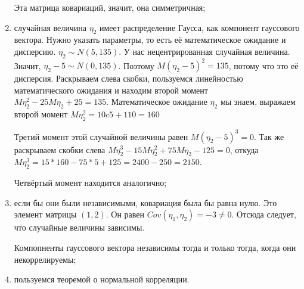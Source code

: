 \begin{enumerate}[label=\alph*)]
  Эта матрица ковариаций, значит, она симметричная;
  \item случайная величина $ \eta_2$ имеет распределение Гаусса, как компонент гауссового вектора.
  Нужно указать параметры, то есть её математическое ожидание и дисперсию.
  $ \eta_2 \sim N \left( 5, 135 \right) $.
  У нас нецентрированная случайная величина.
  Значит, $ \eta_2 - 5 \sim N \left( 0, 135 \right) $.
  Поэтому $M \left( \eta_2 - 5 \right)^2 = 135$, потому что это её дисперсия.
  Раскрываем слева скобки,
  пользуемся линейностью математического ожидания и находим второй момент
  $M \eta_2^2 - 25M \eta_2 + 25 =
    135$.
  Математическое ожидание $ \eta_2$ мы знаем,
  выражаем второй момент $M \eta_2^2 = 10 c\dot 5 + 110 = 160$

  Третий момент этой случайной величины равен $M \left( \eta_2 - 5 \right)^3 = 0$.
  Так же раскрываем скобки слева $M \eta_2^3 - 15M \eta_2^2 + 75M \eta_2 - 125 = 0$,
  откуда $M \eta_2^3 = 15 * 160 - 75 * 5 + 125 = 2400 - 250 = 2150$.

  Четвёртый момент находится аналогично;
  \item если бы они были независимыми, ковариация была бы равна нулю.
  Это элемент матрицы $ \left( 1, 2 \right) $.
  Он равен $Cov \left( \eta_1, \eta_2 \right) = -3 \neq 0$.
  Отсюда следует, что случайные величины зависимы.

  Компопненты гауссового вектора независимы тогда и только тогда, когда они некоррелируемы;
  \item пользуемся теоремой о нормальной корреляции.


\end{enumerate}
